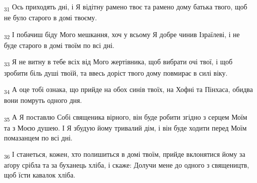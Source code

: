 \begin{tcolorbox}
\textsubscript{31} Ось приходять дні, і Я відітну рамено твоє та рамено дому батька твого, щоб не було старого в домі твоєму.
\end{tcolorbox}
\begin{tcolorbox}
\textsubscript{32} І побачиш біду Мого мешкання, хоч у всьому Я добре чинив Ізраїлеві, і не буде старого в домі твоїм по всі дні.
\end{tcolorbox}
\begin{tcolorbox}
\textsubscript{33} Я не витну в тебе всіх від Мого жертівника, щоб вибрати очі твої, і щоб зробити біль душі твоїй, та ввесь доріст твого дому повмирає в силі віку.
\end{tcolorbox}
\begin{tcolorbox}
\textsubscript{34} А оце тобі ознака, що прийде на обох синів твоїх, на Хофні та Пінхаса, обидва вони помруть одного дня.
\end{tcolorbox}
\begin{tcolorbox}
\textsubscript{35} А Я поставлю Собі священика вірного, він буде робити згідно з серцем Моїм та з Моєю душею. І Я збудую йому тривалий дім, і він буде ходити перед Моїм помазанцем по всі дні.
\end{tcolorbox}
\begin{tcolorbox}
\textsubscript{36} І станеться, кожен, хто полишиться в домі твоїм, прийде вклонятися йому за аґору срібла та за буханець хліба, і скаже: Долучи мене до одного з священицтв, щоб їсти кавалок хліба.
\end{tcolorbox}
